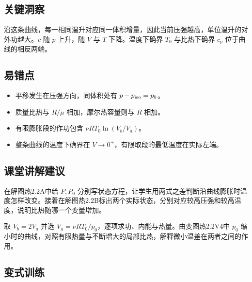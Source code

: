 \documentclass[UTF8,fontset=fandol,a4paper,11pt]{ctexart}
\begin{document}

\subsection*{关键洞察}

沿这条曲线，每一相同温升对应同一体积增量，因此当前压强越高，单位温升的对外功越大。$c$ 随 $p$ 上升，随 $V$ 与 $T$ 下降。温度下确界 $T_0$ 与比热下确界 $c_p$ 位于曲线的相反两端。



\subsection*{易错点}

\begin{itemize}
\item 平移发生在压强方向，同体积处有 $p-p_{\rm iso}=p_0$。
\item 质量比热与 $R/\mu$ 相加，摩尔热容量则与 $R$ 相加。
\item 有限膨胀段的作功包含 $\nu RT_0\ln(V_b/V_a)$。
\item 整条曲线的温度下确界在 $V\to0^+$，有限取段的最低温度在实际左端。
\end{itemize}



\subsection*{课堂讲解建议}

在解图热2.2A中给 $P,P_0$ 分别写状态方程，让学生用两式之差判断沿曲线膨胀时温度怎样改变。接着在解图热2.2B标出两个实际状态，分别对应较高压强和较高温度，说明比热随哪一个变量增加。

取 $V_b=2V_a$ 并选 $V_a=\nu RT_0/p_0$，逐项求功、内能与热量。由变图热2.2V4中 $p_0$ 缩小时的曲线，对照有限热量与不断增大的局部比热，解释微小温差在两者之间的作用。



\subsection*{变式训练}
\end{document}
